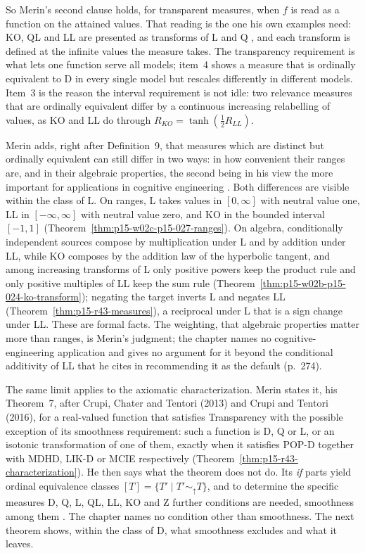So Merin's second clause holds, for transparent measures, when \(f\) is
read as a function on the attained values. That reading is the one his
own examples need: KO, QL and LL are presented as transforms of L and
Q \cite[pp.~269--270 and p.~274, n.~7]{Merin2021Relevance}, and each
transform is defined at the infinite values the measure takes. The
transparency requirement is what lets one function serve all models;
item~4 shows a measure that is ordinally equivalent to D in every single
model but rescales differently in different models. Item~3 is the
reason the interval requirement is not idle: two relevance measures that
are ordinally equivalent differ by a continuous increasing relabelling of
values, as KO and LL do through \(R_{KO}=\tanh(\tfrac12R_{LL})\).

Merin adds, right after Definition~9, that measures which are distinct
but ordinally equivalent can still differ in two ways: in how convenient
their ranges are, and in their algebraic properties, the second being in
his view the more important for applications in cognitive engineering
\cite[p.~270]{Merin2021Relevance}. Both differences are visible within
the class of L. On ranges, L takes values in \([0,\infty]\) with neutral
value one, LL in \([-\infty,\infty]\) with neutral value zero, and KO in
the bounded interval \([-1,1]\)
(Theorem~\ref{thm:p15-w02c-p15-027-ranges}). On algebra, conditionally
independent sources compose by multiplication under L and by addition
under LL, while KO composes by the addition law of the hyperbolic tangent,
and among increasing transforms of L only positive powers keep the
product rule and only positive multiples of LL keep the sum rule
(Theorem~\ref{thm:p15-w02b-p15-024-ko-transform}); negating the target
inverts L and negates LL (Theorem~\ref{thm:p15-r43-measures}), a
reciprocal under L that is a sign change under LL. These are formal
facts. The weighting, that algebraic properties matter more than ranges,
is Merin's judgment; the chapter names no cognitive-engineering
application and gives no argument for it beyond the conditional
additivity of LL that he cites in recommending it as the default
(p.~274).

The same limit applies to the axiomatic characterization. Merin states
it, his Theorem~7, after Crupi, Chater and Tentori (2013) and Crupi and
Tentori (2016), for a real-valued function that satisfies Transparency
with the possible exception of its smoothness requirement: such a
function is D, Q or L, or an isotonic transformation of one of them,
exactly when it satisfies POP-D together with MDHD, LIK-D or MCIE
respectively (Theorem~\ref{thm:p15-r43-characterization}). He then says
what the theorem does not do. Its \emph{if} parts yield ordinal
equivalence classes \([T]=\{T'\mid T'\sim_{\uparrow}T\}\), and to
determine the specific measures D, Q, L, QL, LL, KO and Z further
conditions are needed, smoothness among them
\cite[p.~271]{Merin2021Relevance}. The chapter names no condition other
than smoothness. The next theorem shows, within the class of D, what
smoothness excludes and what it leaves.

